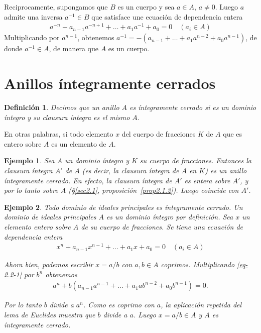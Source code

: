 \documentclass[bibtotoc,leqno,spanish]{amsbook}
\numberwithin{equation}{section}
\theoremstyle{note}
\newtheorem*{definition*}{Definici\'on}
\theoremstyle{note}
\theoremstyle{rem}
\newtheorem{example}{Ejemplo}
\numberwithin{theorem}{section}
\numberwithin{proposition}{section}
\numberwithin{definition}{section}
\numberwithin{lemma}{section}
\numberwithin{corollary}{section}
\numberwithin{example}{section}
\numberwithin{footnote}{section}%
\begin{document}
Reciprocamente, supongamos que $B$ es un cuerpo y sea $a\in A$, $a\neq 0$. Luego $a$ admite una inversa
$a^{-1}\in B$ que satisface une ecuaci\'on de dependencia entera
\begin{gather*}
a^{-n}+a_{n-1}a^{-n+1}+\dots+a_{1}a^{-1}+a_{0} =0\quad(a_{i}\in A)
\end{gather*}
Multiplicando por $a^{n-1}$, obtenemos $a^{-1}=-(a_{n-1}+\dots+a_{1}a^{n-2}+a_{0}a^{n-1})$, de donde
$a^{-1}\in A$, de manera que $A$ es un cuerpo.

\section{Anillos \'integramente cerrados}\label{sec2.2}

\begin{definition*}
Decimos que un anillo $A$ es \'integramente cerrado si es un dominio \'integro y su clausura \'integra es
el mismo $A$.
\end{definition*}

En otras palabras, si todo elemento $x$ del cuerpo de fracciones $K$ de $A$ que es entero sobre $A$
es un elemento de $A$.

\begin{example}
Sea $A$ un dominio \'integro y $K$ su cuerpo de fracciones. Entonces la {\em clausura \'integra} $A'$
de $A$ (es decir, la clausura \'integra de $A$ en $K$) es un anillo \'integramente cerrado. En efecto, la
clausura \'integra de $A'$ es entera sobre $A'$, y por lo tanto sobre $A$ (\S\ref{sec2.1}, proposici\'on~\ref{prop2.1.2}).
Luego coincide con $A'$.
\end{example}

\begin{example}{\itshape Todo dominio de ideales principales es \'integramente cerrado.}
Un dominio de ideales principales $A$ es un dominio \'integro por definici\'on. Sea $x$
un elemento entero sobre $A$ de su cuerpo de fracciones. Se tiene una ecuaci\'on de dependencia
entera
\begin{gather}\label{eq-2.2-1}
x^{n}+a_{n-1}x^{n-1}+\dots+a_{1}x+a_{0}=0\quad(a_{i}\in A)
\end{gather}

Ahora bien, podemos escribir $x = a/b$ con $a,b\in A$ {\em coprimos.} Multiplicando \eqref{eq-2.2-1}
por $b^{n}$ obtenemos
\begin{gather*}
a^{n}+b(a_{n-1}a^{n-1}+\dots+a_{1}ab^{n-2}+a_{0}b^{n-1}) = 0.
\end{gather*}

Por lo tanto $b$ divide a $a^{n}$. Como es coprimo con $a$, la aplicaci\'on repetida del lema de Euclides
muestra que $b$ divide a $a$. Luego $x = a/b\in A$ y $A$ es \'integramente cerrado.
\end{example}
\end{document}
